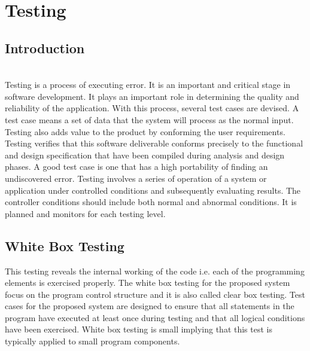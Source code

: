 \chapter{Testing}


\section{Introduction}\\
Testing is a process of executing error. It is an important and critical stage in software development. It plays an important role in determining the quality and reliability of the application. With this process, several test cases are devised. A test case means a set of data that the system will process as the normal input. Testing also adds value to the product by conforming the user requirements. Testing verifies that this software deliverable conforms precisely to the functional and design specification that have been compiled during analysis and design phases. A good test case is one that has a high portability of finding an undiscovered error. Testing involves a series of operation of a system or application under controlled conditions and subsequently evaluating results. The controller conditions should include both normal and abnormal conditions. It is planned and monitors for each testing level.



\section{White Box Testing}
This testing reveals the internal working of the code i.e. each of the programming elements is exercised properly. The white box testing for the proposed system focus on the program control structure and it is also called clear box testing. Test cases for the proposed system are designed to ensure that all statements in the program have executed at least once during testing and that all logical conditions have been exercised. White box testing is small implying that this test is typically applied to small program components.





